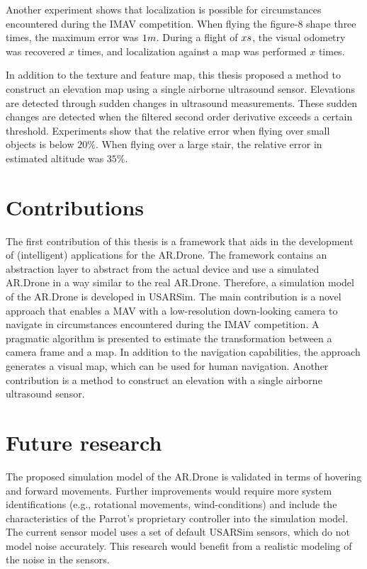 Another experiment shows that localization is possible for circumstances encountered during the IMAV competition.
When flying the figure-8 shape three times, the maximum error was $1\small{m}$.
During a flight of $x\small{s}$, the visual odometry was recovered $x$ times, and localization against a map was performed $x$ times.

In addition to the texture and feature map, this thesis proposed a method to construct an elevation map using a single airborne ultrasound sensor.
Elevations are detected through sudden changes in ultrasound measurements.
These sudden changes are detected when the filtered second order derivative exceeds a certain threshold.
Experiments show that the relative error when flying over small objects is below $20\%$.
When flying over a large stair, the relative error in estimated altitude was $35\%$.









\section{Contributions}
\label{sec:conclusions-contributions}

The first contribution of this thesis is a framework that aids in the development of (intelligent) applications for the AR.Drone.
The framework contains an abstraction layer to abstract from the actual device and use a simulated AR.Drone in a way similar to the real AR.Drone.
Therefore, a simulation model of the AR.Drone is developed in USARSim.
The main contribution is a novel approach that enables a MAV with a low-resolution down-looking camera to navigate in circumstances encountered during the IMAV competition.
A pragmatic algorithm is presented to estimate the transformation between a camera frame and a map.
In addition to the navigation capabilities, the approach generates a visual map, which can be used for human navigation.
Another contribution is a method to construct an elevation with a single airborne ultrasound sensor.

\section{Future research}
\label{sec:conclusions-future}

The proposed simulation model of the AR.Drone is validated in terms of hovering and forward movements. 
Further improvements would require more system identifications (e.g., rotational movements, wind-conditions) and include the characteristics of the Parrot's proprietary controller into the simulation model. 
The current sensor model uses a set of default USARSim sensors, which do not model noise accurately.
This research would benefit from a realistic modeling of the noise in the sensors.

